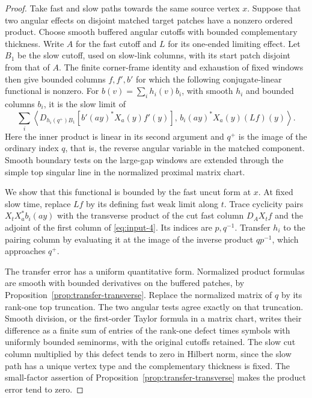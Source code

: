 \begin{proof}
Take fast and slow paths towards the same source vertex $x$. Suppose
that two angular effects on disjoint matched target patches have a
nonzero ordered product. Choose smooth buffered angular cutoffs with
bounded complementary thickness. Write $A$ for the fast cutoff and
$L$ for its one-ended limiting effect. Let $B_1$ be the slow cutoff,
used on slow-link columns, with its start patch disjoint from that of
$A$. The finite corner-frame identity and exhaustion of fixed windows
then give bounded columns $f,f',b'$ for which the following
conjugate-linear functional is nonzero. For
$b(v)=\sum_i h_i(v)b_i$, with smooth $h_i$ and bounded columns $b_i$,
it is the slow limit of
\begin{equation}
 \sum_i\left\langle
 D_{h_i(q^+)B_1}
       [b'(ay)^*X_a(y)f'(y)],\,
 b_i(ay)^*X_a(y)(Lf)(y)
 \right\rangle.
 \label{eq:input-4}
\end{equation}
Here the inner product is linear in its second argument and $q^+$ is
the image of the ordinary index $q$, that is, the reverse angular
variable in the matched component. Smooth boundary tests on the
large-gap windows are extended through the simple top singular line
in the normalized proximal matrix chart.

We show that this functional is bounded by the fast uncut form at
$x$. At fixed slow time, replace $Lf$ by its defining fast weak limit
along $t$. Trace cyclicity pairs
$X_tX_a^*b_i(ay)$ with the transverse product of the cut fast column
$D_AX_tf$ and the adjoint of the first column of
\eqref{eq:input-4}. Its indices are $p,q^{-1}$. Transfer $h_i$ to the
pairing column by evaluating it at the image of the inverse product
$qp^{-1}$, which approaches $q^+$.

The transfer error has a uniform quantitative form. Normalized
product formulas are smooth with bounded derivatives on the buffered
patches, by Proposition~\ref{prop:transfer-transverse}. Replace the
normalized matrix of $q$ by its rank-one top truncation. The two
angular tests agree exactly on that truncation. Smooth division, or
the first-order Taylor formula in a matrix chart, writes their
difference as a finite sum of entries of the rank-one defect times
symbols with uniformly bounded seminorms, with the original cutoffs
retained. The slow cut column multiplied by this defect tends to zero
in Hilbert norm, since the slow path has a unique vertex type and the
complementary thickness is fixed. The small-factor assertion of
Proposition~\ref{prop:transfer-transverse} makes the product error tend
to zero.


\end{proof}
